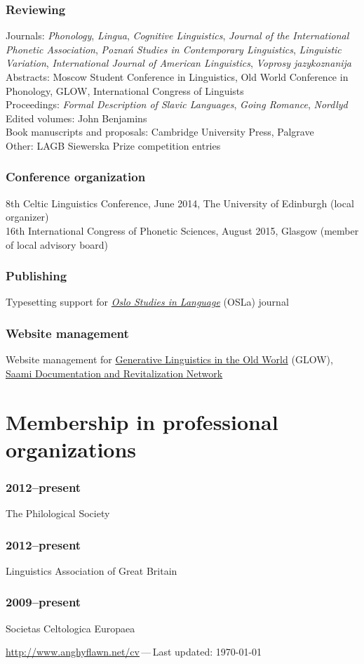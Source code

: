 \documentclass[a4paper,11pt]{article}
\newlength\blockwidth
\newcommand\cvitem[1]{\hspace*{\blockwidth}\begin{minipage}[t]{\linewidth-\blockwidth}
#1
\end{minipage}\par}
\newcommand{\block}[2]{\subsubsection{#1}\cvitem{#2}}
\begin{document}
\block{Reviewing}{Journals: \emph{Phonology}, \emph{Lingua}, \emph{Cognitive Linguistics}, \emph{Journal of the International Phonetic Association}, \emph{Poznań Studies in Contemporary Linguistics}, \emph{Linguistic Variation}, \emph{International Journal of American Linguistics}, \emph{Voprosy jazykoznanija}\\
Abstracts: Moscow Student Conference in Linguistics, Old World Conference in Phonology, GLOW, International Congress of Linguists\\
Proceedings: \emph{Formal Description of Slavic Languages}, \emph{Going Romance}, \emph{Nordlyd}\\
Edited volumes: John Benjamins\\
Book manuscripts and proposals: Cambridge University Press, Palgrave\\
Other: LAGB Siewerska Prize competition entries}
\block{Conference organization}{8th Celtic Linguistics Conference, June 2014, The University of Edinburgh (local organizer)\\
16th International Congress of Phonetic Sciences, August 2015, Glasgow (member of local advisory board)}
\block{Publishing}{Typesetting support for \href{https://www.journals.uio.no/index.php/osla/index}{\emph{Oslo Studies in Language}} (OSLa) journal}
\block{Website management}{Website management for \href{http://www.glow-linguistics.org}{Generative Linguistics in the Old World} (GLOW), \href{http://saamidocnet.uit.no}{Saami Documentation and Revitalization Network}}


\section{Membership in professional organizations}
\block{2012--present}{The Philological Society}
\block{2012--present}{Linguistics Association of Great Britain}
\block{2009--present}{Societas Celtologica Europaea}

\vfill{}
\hrulefill

\begin{center}
{\footnotesize \href{http://www.anghyflawn.net/cv}{http://www.anghyflawn.net/cv}{\,---\,}Last  updated: \today
}
\end{center}
\end{document}
